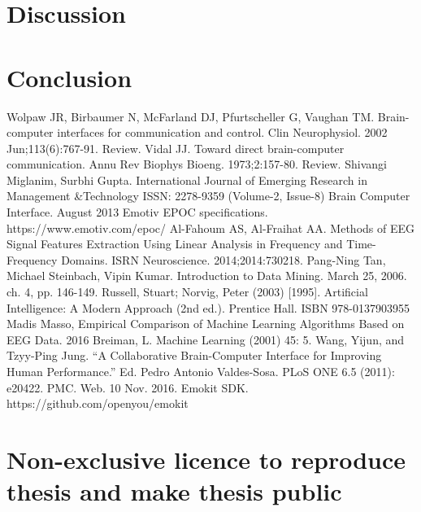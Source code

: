 \documentclass[12pt]{article}
\begin{document}
\newpage
\section{Discussion}

\newpage
\section{Conclusion}

\newpage
\begin{thebibliography}{9}

Wolpaw JR, Birbaumer N, McFarland DJ, Pfurtscheller G, Vaughan TM.
Brain-computer interfaces for communication and control. Clin Neurophysiol. 2002 
Jun;113(6):767-91. Review.
Vidal JJ. Toward direct brain-computer communication. Annu Rev Biophys Bioeng.
1973;2:157-80. Review.
Shivangi Miglanim, Surbhi Gupta.  International Journal of Emerging Research in Management \&Technology
ISSN: 2278-9359 (Volume-2, Issue-8)
Brain Computer Interface. 
August 2013
Emotiv EPOC specifications. https://www.emotiv.com/epoc/
Al-Fahoum AS, Al-Fraihat AA. Methods of EEG Signal Features Extraction Using Linear Analysis in Frequency and Time-Frequency Domains. ISRN Neuroscience. 2014;2014:730218.
Pang-Ning Tan, Michael Steinbach, Vipin Kumar. Introduction to Data Mining. March 25, 2006. ch. 4, pp. 146-149.
Russell, Stuart; Norvig, Peter (2003) [1995]. Artificial Intelligence: A Modern Approach (2nd ed.). Prentice Hall. ISBN 978-0137903955
Madis Masso, Empirical Comparison of Machine Learning Algorithms Based on EEG Data. 2016
Breiman, L. Machine Learning (2001) 45: 5. 
Wang, Yijun, and Tzyy-Ping Jung. ``A Collaborative Brain-Computer Interface for Improving Human Performance.'' Ed. Pedro Antonio Valdes-Sosa. PLoS ONE 6.5 (2011): e20422. PMC. Web. 10 Nov. 2016.
Emokit SDK. https://github.com/openyou/emokit
\end{thebibliography}

%

\appendix
\pagebreak
\section*{\small Non-exclusive licence to reproduce thesis and make thesis public}
\end{document}
